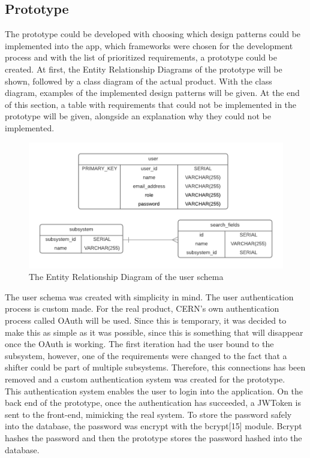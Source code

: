 \documentclass[paper=a4, fontsize=11pt,twoside]{scrartcl}	%
\begin{document}
\subsection{Prototype}
The prototype could be developed with choosing which design patterns could be implemented into the app, which frameworks were chosen for the development process and with the list of prioritized requirements, a prototype could be created.  At first, the Entity Relationship Diagrams of the prototype will be shown, followed by a class diagram of the actual product. With the class diagram, examples of the implemented design patterns will be given. At the end of this section, a table with requirements that could not be implemented in the prototype will be given, alongside an explanation why they could not be implemented.
\noindent
\begin{figure}[H]
\centering
\includegraphics[scale=0.5]{erd_user}
\caption{The Entity Relationship Diagram of the user schema}
\end{figure}
\noindent
The user schema was created with simplicity in mind. The user authentication process is custom made. For the real product, CERN's own authentication process called OAuth will be used. Since this is temporary, it was decided to make this as simple as it was possible, since this is something that will disappear once the OAuth is working. The first iteration had the user bound to the subsystem, however, one of the requirements were changed to the fact that a shifter could be part of multiple subsystems. Therefore, this connections has been removed and a custom authentication system was created for the prototype. \\
This authentication system enables the user to login into the application. On the back end of the prototype, once the authentication has succeeded, a JWToken is sent to the front-end, mimicking the real system. To store the password safely into the database, the password was encrypt with the bcrypt[15] module. Bcrypt hashes the password and then the prototype stores the password hashed into the database.
\end{document}
